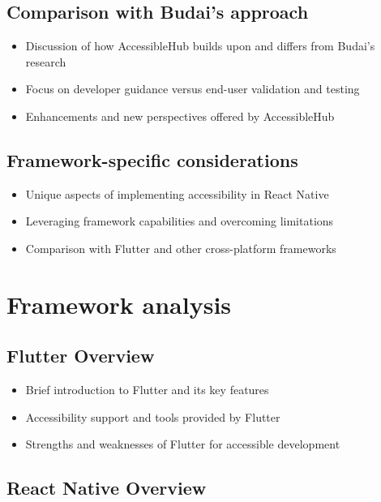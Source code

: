 \subsection{Comparison with Budai's approach}

\begin{itemize}
\item Discussion of how AccessibleHub builds upon and differs from Budai's research
\item Focus on developer guidance versus end-user validation and testing
\item Enhancements and new perspectives offered by AccessibleHub
\end{itemize}

\subsection{Framework-specific considerations}

\begin{itemize}
\item Unique aspects of implementing accessibility in React Native
\item Leveraging framework capabilities and overcoming limitations
\item Comparison with Flutter and other cross-platform frameworks
\end{itemize}

\section{Framework analysis}

\subsection{Flutter Overview}

\begin{itemize}
\item Brief introduction to Flutter and its key features
\item Accessibility support and tools provided by Flutter
\item Strengths and weaknesses of Flutter for accessible development
\end{itemize}

\subsection{React Native Overview}

